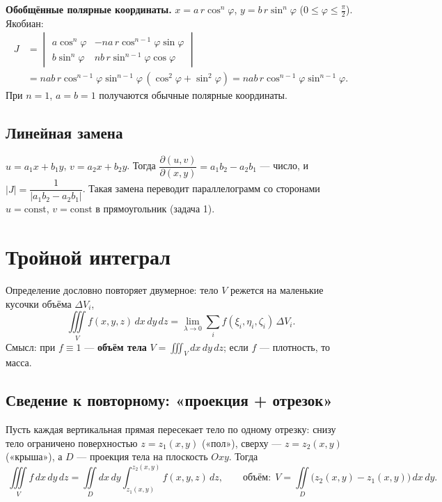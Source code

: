 \textbf{Обобщённые полярные координаты.} $x=a\,r\cos^n\varphi$, $y=b\,r\sin^n\varphi$ ($0\leqslant\varphi\leqslant\frac\pi2$). Якобиан:
\[
\begin{aligned}J&=\begin{vmatrix}a\cos^n\varphi&-na\,r\cos^{n-1}\varphi\sin\varphi\\ b\sin^n\varphi&nb\,r\sin^{n-1}\varphi\cos\varphi\end{vmatrix}
\\&=nab\,r\cos^{n-1}\varphi\sin^{n-1}\varphi\,(\cos^2\varphi+\sin^2\varphi)=nab\,r\cos^{n-1}\varphi\sin^{n-1}\varphi .\end{aligned}
\]
При $n=1$, $a=b=1$ получаются обычные полярные координаты.

\subsection{Линейная замена}
$u=a_1x+b_1y$, $v=a_2x+b_2y$. Тогда $\dfrac{\partial(u,v)}{\partial(x,y)}=a_1b_2-a_2b_1$ --- число, и $|J|=\dfrac{1}{|a_1b_2-a_2b_1|}$. Такая замена переводит параллелограмм со сторонами $u=\mathrm{const}$, $v=\mathrm{const}$ в прямоугольник (задача 1).

\section{Тройной интеграл}
Определение дословно повторяет двумерное: тело $V$ режется на маленькие кусочки объёма $\Delta V_i$,
\[
\iiint\limits_V f(x,y,z)\,dx\,dy\,dz=\lim_{\lambda\to0}\sum_i f(\xi_i,\eta_i,\zeta_i)\,\Delta V_i .
\]
Смысл: при $f\equiv1$ --- \textbf{объём тела} $V=\iiint_V dx\,dy\,dz$; если $f$ --- плотность, то масса.

\subsection{Сведение к повторному: «проекция + отрезок»}
Пусть каждая вертикальная прямая пересекает тело по одному отрезку: снизу тело ограничено поверхностью $z=z_1(x,y)$ («пол»), сверху --- $z=z_2(x,y)$ («крыша»), а $D$ --- проекция тела на плоскость $Oxy$. Тогда
\[
\boxed{\ \iiint\limits_V f\,dx\,dy\,dz=\iint\limits_D dx\,dy\int_{z_1(x,y)}^{z_2(x,y)} f(x,y,z)\,dz,\qquad
\text{объём:}\ \ V=\iint\limits_D\bigl(z_2(x,y)-z_1(x,y)\bigr)\,dx\,dy.\ }
\]

